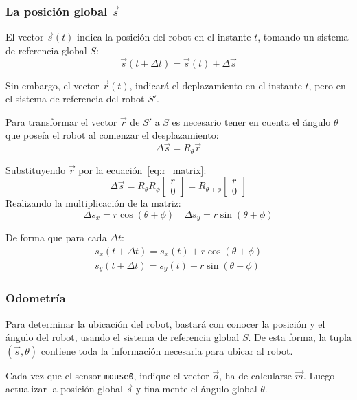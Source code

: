 \documentclass[10pt,a4paper,hidelinks,twocolumn]{article}
\begin{document}
\subsubsection{La posición global $\vec{s}$}
El vector $\vec{s}(t)$ indica la posición del robot en el instante $t$, tomando 
un sistema de referencia global $S$:
$$
	\vec{s}(t + \Delta t) =
		\vec{s}(t) + \Delta \vec{s}
$$

Sin embargo, el vector $\vec{r}(t)$, indicará el deplazamiento en el instante 
$t$, pero en el sistema de referencia del robot $S'$.

Para transformar el vector $\vec{r}$ de $S'$ a $S$ es necesario tener en cuenta 
el ángulo $\theta$ que poseía el robot al comenzar el desplazamiento:
$$
	\Delta\vec{s} = R_{\theta} \vec{r}
$$

Substituyendo $\vec{r}$ por la ecuación~\ref{eq:r_matrix}:
$$
	\Delta\vec{s} = R_{\theta} R_{\phi}
			\begin{bmatrix}
				r \\
				0
			\end{bmatrix}
		= R_{\theta + \phi}
			\begin{bmatrix}
				r \\
				0
			\end{bmatrix}
$$
Realizando la multiplicación de la matriz:
$$
	\Delta s_x = r\cos(\theta + \phi) \quad
	\Delta s_y = r\sin(\theta + \phi)
$$

De forma que para cada $\Delta t$:
\begin{equation}
\begin{split}
	s_x(t + \Delta t) = s_x(t) + r\cos(\theta + \phi) \\
	s_y(t + \Delta t) = s_y(t) + r\sin(\theta + \phi)
\end{split}
\label{eq:s}
\end{equation}

\subsubsection{Odometría}
Para determinar la ubicación del robot, bastará con conocer la posición y el 
ángulo del robot, usando el sistema de referencia global $S$. De esta forma, la 
tupla $(\vec{s}, \theta)$ contiene toda la información necesaria para ubicar al 
robot.

Cada vez que el sensor \texttt{mouse0}, indique el vector $\vec{o}$, ha de 
calcularse $\vec{m}$. Luego actualizar la posición global $\vec{s}$ y finalmente 
el ángulo global $\theta$.
\end{document}

